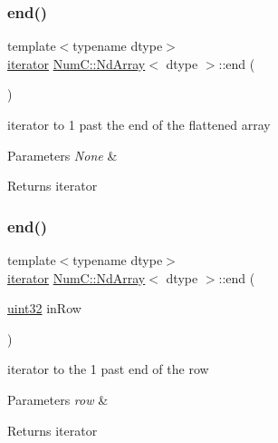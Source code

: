 \subsubsection{\texorpdfstring{end()}{end()}\hspace{0.1cm}{\footnotesize\ttfamily [1/2]}}
{\footnotesize\ttfamily template$<$typename dtype$>$ \\
\mbox{\hyperlink{class_num_c_1_1_nd_array_a49cd61f019d7106a40ffdb9c3ee98f08}{iterator}} \mbox{\hyperlink{class_num_c_1_1_nd_array}{Num\+C\+::\+Nd\+Array}}$<$ dtype $>$\+::end (\begin{DoxyParamCaption}{ }\end{DoxyParamCaption})\hspace{0.3cm}{\ttfamily [inline]}}

iterator to 1 past the end of the flattened array


\begin{DoxyParams}{Parameters}
{\em None} & \\
\hline
\end{DoxyParams}
\begin{DoxyReturn}{Returns}
iterator 
\end{DoxyReturn}
\mbox{\label{class_num_c_1_1_nd_array_a9d80422e72f05dc0af9945ee091ae261}} 
\subsubsection{\texorpdfstring{end()}{end()}\hspace{0.1cm}{\footnotesize\ttfamily [2/2]}}
{\footnotesize\ttfamily template$<$typename dtype$>$ \\
\mbox{\hyperlink{class_num_c_1_1_nd_array_a49cd61f019d7106a40ffdb9c3ee98f08}{iterator}} \mbox{\hyperlink{class_num_c_1_1_nd_array}{Num\+C\+::\+Nd\+Array}}$<$ dtype $>$\+::end (\begin{DoxyParamCaption}\item[{\mbox{\hyperlink{namespace_num_c_ae685802ca6d3035f2b400b081e3953fa}{uint32}}}]{in\+Row }\end{DoxyParamCaption})\hspace{0.3cm}{\ttfamily [inline]}}

iterator to the 1 past end of the row


\begin{DoxyParams}{Parameters}
{\em row} & \\
\hline
\end{DoxyParams}
\begin{DoxyReturn}{Returns}
iterator 
\end{DoxyReturn}
\mbox{\label{class_num_c_1_1_nd_array_acb277ffe6553d9c77f2c86e62fe96945}} 
